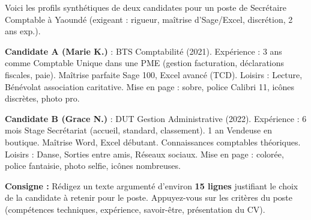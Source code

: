 \documentclass[11pt]{article}
\begin{document}
\begin{exercice}
Voici les profils synthétiques de deux candidates pour un poste de Secrétaire Comptable à Yaoundé (exigeant : rigueur, maîtrise d'Sage/Excel, discrétion, 2 ans exp.).

\textbf{Candidate A (Marie K.)} : BTS Comptabilité (2021). Expérience : 3 ans comme Comptable Unique dans une PME (gestion facturation, déclarations fiscales, paie). Maîtrise parfaite Sage 100, Excel avancé (TCD). Loisirs : Lecture, Bénévolat association caritative. Mise en page : sobre, police Calibri 11, icônes discrètes, photo pro.

\textbf{Candidate B (Grace N.)} : DUT Gestion Administrative (2022). Expérience : 6 mois Stage Secrétariat (accueil, standard, classement). 1 an Vendeuse en boutique. Maîtrise Word, Excel débutant. Connaissances comptables théoriques. Loisirs : Danse, Sorties entre amis, Réseaux sociaux. Mise en page : colorée, police fantaisie, photo selfie, icônes nombreuses.

\textbf{Consigne :} Rédigez un texte argumenté d'environ \textbf{15 lignes} justifiant le choix de la candidate à retenir pour le poste. Appuyez-vous sur les critères du poste (compétences techniques, expérience, savoir-être, présentation du CV).
\end{exercice}
\end{document}
